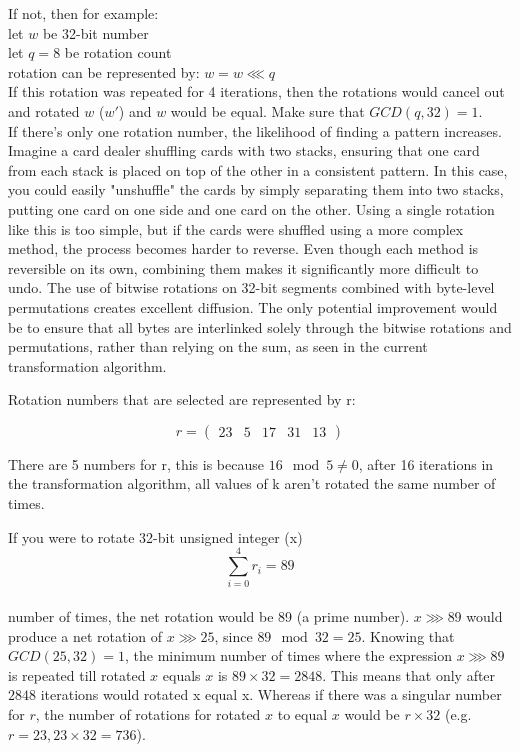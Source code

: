 \documentclass[fleqn, a4paper,12pt]{article}
\begin{document}
If not, then for example: \\
let $w$ be 32-bit number\\
let $q = 8$ be rotation count\\
rotation can be represented by: $w = w \lll q$\\
If this rotation was repeated for 4 iterations, then the rotations would cancel out and rotated $w$ ($w'$) and $w$ would be equal. Make sure that $GCD(q, 32) = 1$. \\

If there's only one rotation number, the likelihood of finding a pattern increases. Imagine a card dealer shuffling cards with two stacks, ensuring that one card from each stack is placed on top of the other in a consistent pattern. In this case, you could easily "unshuffle" the cards by simply separating them into two stacks, putting one card on one side and one card on the other. Using a single rotation like this is too simple, but if the cards were shuffled using a more complex method, the process becomes harder to reverse. Even though each method is reversible on its own, combining them makes it significantly more difficult to undo. The use of bitwise rotations on 32-bit segments combined with byte-level permutations creates excellent diffusion. The only potential improvement would be to ensure that all bytes are interlinked solely through the bitwise rotations and permutations, rather than relying on the sum, as seen in the current transformation algorithm.

Rotation numbers that are selected are represented by r:

\[
r = 
\begin{pmatrix}
		23 & 5 & 17 & 31 & 13
\end{pmatrix}
\]

There are 5 numbers for r, this is because $16 \mod 5 \neq 0$, after 16 iterations in the transformation algorithm, all values of k aren't rotated the same number of times.

If you were to rotate 32-bit unsigned integer (x)
\[
\sum_{i=0}^4 r_i = 89
\]
\\
number of times, the net rotation would be 89 (a prime number). $x \ggg 89$ would produce a net rotation of $x \ggg 25$, since $89 \mod 32=25$. Knowing that $GCD(25, 32) = 1$, the minimum number of times where the expression $x \ggg 89$ is repeated till rotated $x$ equals $x$ is $89 \times 32 = 2848$. This means that only after $2848$ iterations would rotated x equal x. Whereas if there was a singular number for $r$, the number of rotations for rotated $x$ to equal $x$ would be $r \times 32$ (e.g. $r=23, 23 \times 32 = 736$). \\
\end{document}
